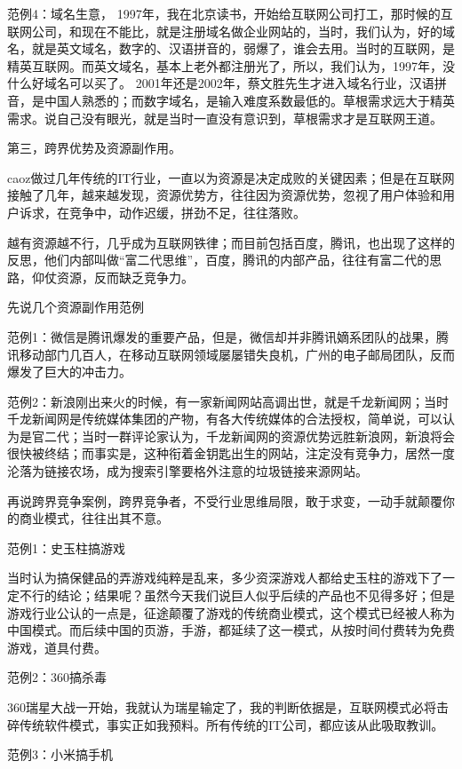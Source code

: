    范例4：域名生意， 1997年，我在北京读书，开始给互联网公司打工，那时候的互联网公司，和现在不能比，就是注册域名做企业网站的，当时，我们认为，好的域名，就是英文域名，数字的、汉语拼音的，弱爆了，谁会去用。当时的互联网，是精英互联网。而英文域名，基本上老外都注册光了，所以，我们认为，1997年，没什么好域名可以买了。 2001年还是2002年，蔡文胜先生才进入域名行业，汉语拼音，是中国人熟悉的；而数字域名，是输入难度系数最低的。草根需求远大于精英需求。说自己没有眼光，就是当时一直没有意识到，草根需求才是互联网王道。


第三，跨界优势及资源副作用。

   caoz做过几年传统的IT行业，一直以为资源是决定成败的关键因素；但是在互联网接触了几年，越来越发现，资源优势方，往往因为资源优势，忽视了用户体验和用户诉求，在竞争中，动作迟缓，拼劲不足，往往落败。

    越有资源越不行，几乎成为互联网铁律；而目前包括百度，腾讯，也出现了这样的反思，他们内部叫做“富二代思维”，百度，腾讯的内部产品，往往有富二代的思路，仰仗资源，反而缺乏竞争力。

   先说几个资源副作用范例

    范例1：微信是腾讯爆发的重要产品，但是，微信却并非腾讯嫡系团队的战果，腾讯移动部门几百人，在移动互联网领域屡屡错失良机，广州的电子邮局团队，反而爆发了巨大的冲击力。

    范例2：新浪刚出来火的时候，有一家新闻网站高调出世，就是千龙新闻网；当时千龙新闻网是传统媒体集团的产物，有各大传统媒体的合法授权，简单说，可以认为是官二代；当时一群评论家认为，千龙新闻网的资源优势远胜新浪网，新浪将会很快被终结；而事实是，这种衔着金钥匙出生的网站，注定没有竞争力，居然一度沦落为链接农场，成为搜索引擎要格外注意的垃圾链接来源网站。

   再说跨界竞争案例，跨界竞争者，不受行业思维局限，敢于求变，一动手就颠覆你的商业模式，往往出其不意。

   范例1：史玉柱搞游戏

     当时认为搞保健品的弄游戏纯粹是乱来，多少资深游戏人都给史玉柱的游戏下了一定不行的结论；结果呢？虽然今天我们说巨人似乎后续的产品也不见得多好；但是游戏行业公认的一点是，征途颠覆了游戏的传统商业模式，这个模式已经被人称为中国模式。而后续中国的页游，手游，都延续了这一模式，从按时间付费转为免费游戏，道具付费。

   范例2：360搞杀毒

      360瑞星大战一开始，我就认为瑞星输定了，我的判断依据是，互联网模式必将击碎传统软件模式，事实正如我预料。所有传统的IT公司，都应该从此吸取教训。

    范例3：小米搞手机

